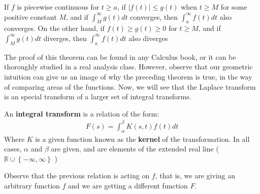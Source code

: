 \begin{thm}
	If $f$ is piecewise continuous for $t \geq a$, if $ \vert f(t) \vert \leq g(t) $ when $t \geq M$ for some positive constant $M$, and if $ \int_M^\infty g(t)dt $ converges, then $ \int_a^{\infty} f(t) dt $ also converges. On the other hand, if $f(t) \geq g(t) \geq 0 $ for $ t \geq M$, and if $ \int_M^{\infty} g(t) dt $ diverges, then $ \int_a^{\infty} f(t) dt $ also diverges
\end{thm} 
The proof of this theorem can be found in any Calculus book, or it can be thoroughly studied in a real analysis class.
However, observe that our geometric intuition can give us an image of why the preceding theorem is true, in the way of comparing areas of the functions.
Now, we will see that the Laplace transform is an special transform of a larger set of integral transforms.
\begin{define}
	An \textbf{integral transform} is a relation of the form:
	\begin{align*}
	F(s) = \int_{\alpha}^{\beta} K(s,t)f(t) dt
	\end{align*}
	Where $K$ is a given function known as the \textbf{kernel} of the transformation. In all cases, $ \alpha $ and $ \beta$ are given, and are elements of the extended real line ( $\mathbb{R} \cup \left\lbrace  -\infty,\infty \right\rbrace$ ) 
	\end{define}
Observe that the previous relation is acting on $f$, that is, we are giving an arbitrary function $f$ and we are getting a different function $F$.

